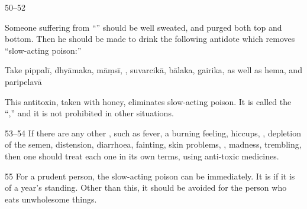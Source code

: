 \begin{translation}    
    
    \item[ 50--52]
    
        Someone suffering from “” should be well
        sweated, and purged both top and bottom.  Then he should be
        made to drink the following  antidote which removes “slow-acting
        poison:”
    
    Take
    \gls{pippalī},
    \gls{dhyāmaka},
    \gls{māṃsī},
,
\gls{suvarcikā},
\gls{bālaka}, 
\gls{gairika}, as well as \gls{hema},
and
\gls{paripelavā}

This antitoxin, taken with honey, eliminates slow-acting poison. It is called the
“,” and it is not prohibited in other situations.
    
    
    \item[ 53--54]
    If there are any other , such as fever, a burning
    feeling, hiccups, , depletion of the semen,
    distension, diarrhoea, fainting, skin problems,
    , madness, trembling, then one
    should treat each one in its own terms,  using anti-toxic
    medicines.
    
    \item[ 55] For a prudent person, the slow-acting poison can be 
immediately.  It is  if it is of a year's standing. Other
than this, it should be avoided for the person who eats unwholesome things.

    \end{translation}


